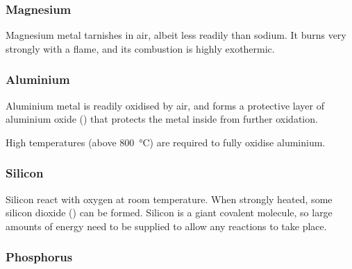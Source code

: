 
			\subsubsection{Magnesium}

				Magnesium metal tarnishes in air, albeit less readily than sodium. It burns very strongly with a  flame, and
				its combustion is highly exothermic.



			\pagebreak
			\subsubsection{Aluminium}

				Aluminium metal is readily oxidised by air, and forms a protective layer of aluminium oxide () that protects the
				metal inside from further oxidation.

				High temperatures (above \SI{800}{\celsius}) are required to fully oxidise aluminium.



			\subsubsection{Silicon}

				Silicon  react with oxygen at room temperature. When strongly heated, some silicon dioxide () can be
				formed. Silicon is a giant covalent molecule, so large amounts of energy need to be supplied to allow any reactions to
				take place.



			\subsubsection{Phosphorus}

